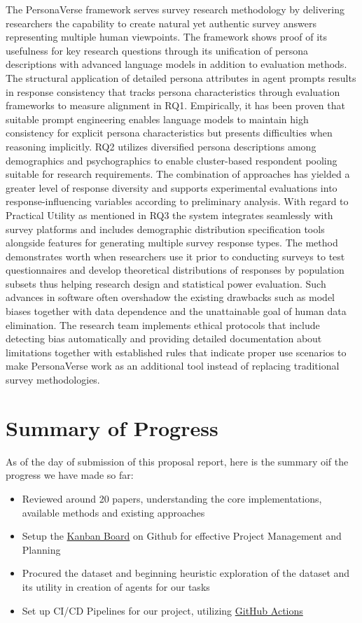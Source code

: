 \documentclass[11pt]{article}
\begin{document}
The PersonaVerse framework serves survey research methodology by delivering researchers the capability to create natural yet authentic survey answers representing multiple human viewpoints. The framework shows proof of its usefulness for key research questions through its unification of persona descriptions with advanced language models in addition to evaluation methods. The structural application of detailed persona attributes in agent prompts results in response consistency that tracks persona characteristics through evaluation frameworks to measure alignment in RQ1. Empirically, it has been proven that suitable prompt engineering enables language models to maintain high consistency for explicit persona characteristics but presents difficulties when reasoning implicitly. RQ2 utilizes diversified persona descriptions among demographics and psychographics to enable cluster-based respondent pooling suitable for research requirements. The combination of approaches has yielded a greater level of response diversity and supports experimental evaluations into response-influencing variables according to preliminary analysis. With regard to Practical Utility as mentioned in RQ3 the system integrates seamlessly with survey platforms and includes demographic distribution specification tools alongside features for generating multiple survey response types. The method demonstrates worth when researchers use it prior to conducting surveys to test questionnaires and develop theoretical distributions of responses by population subsets thus helping research design and statistical power evaluation. Such advances in software often overshadow the existing drawbacks such as model biases together with data dependence and the unattainable goal of human data elimination. The research team implements ethical protocols that include detecting bias automatically and providing detailed documentation about limitations together with established rules that indicate proper use scenarios to make PersonaVerse work as an additional tool instead of replacing traditional survey methodologies.

\section*{Summary of Progress}

As of the day of submission of this proposal report, here is the summary oif the progress we have made so far:
\begin{itemize}
    \item Reviewed around 20 papers, understanding the core implementations, available methods and existing approaches
    \item Setup the \href{https://github.com/users/aryashah2k/projects/2}{Kanban Board} on Github \citep{Shah_All_the_world_s_2025} for effective Project Management and Planning
    \item Procured the dataset and beginning heuristic exploration of the dataset and its utility in creation of agents for our tasks
    \item Set up CI/CD Pipelines for our project, utilizing \href{https://github.com/aryashah2k/PersonaVerse/tree/main/.github/workflows}{GitHub Actions}
\end{itemize}
\end{document}
